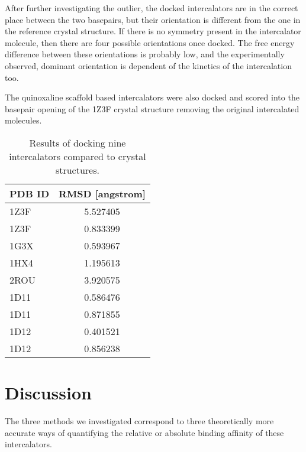After further investigating the outlier, the docked intercalators are in the correct place between the two basepairs, but their orientation is different from the one in the reference crystal structure. If there is no symmetry present in the intercalator molecule, then there are four possible orientations once docked. The free energy difference between these orientations is probably low, and the experimentally observed, dominant orientation is dependent of the kinetics of the intercalation too.

The quinoxaline scaffold based intercalators were also docked and scored into the basepair opening of the 1Z3F crystal structure removing the original intercalated molecules. 

% 
\begin{table}[h]
  \caption{Results of docking nine intercalators compared to crystal structures.}
  \label{tab:docking}
  \centering
  \begin{tabular}{lS[round-mode=figures,round-precision=2]}
  \toprule
  {PDB ID} & {RMSD [angstrom]} \\
  \midrule
  1Z3F &  5.527405 \\
  1Z3F &  0.833399 \\
  1G3X &  0.593967 \\
  1HX4 &  1.195613 \\
  2ROU &  3.920575 \\
  1D11 &  0.586476 \\
  1D11 &  0.871855 \\
  1D12 &  0.401521 \\
  1D12 &  0.856238 \\
  \bottomrule
  \end{tabular}
\end{table}








\section{Discussion}

The three methods we investigated correspond to three theoretically more accurate ways of quantifying the relative or absolute binding affinity of these intercalators. 

